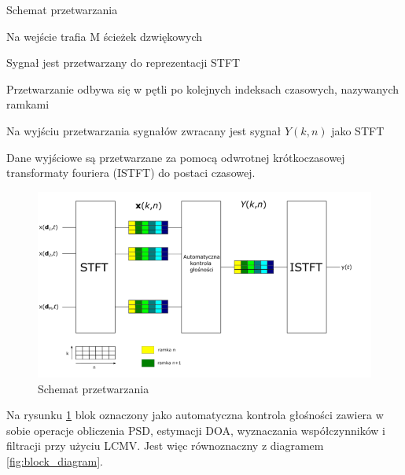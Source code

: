 \begin{algorithm}
  
  \caption{Schemat przetwarzania}
  \begin{algorithmic}[1]
    \State Na wejście trafia M ścieżek dzwiękowych
    
    \State Sygnał jest przetwarzany do reprezentacji STFT
    
    \State Przetwarzanie odbywa się w pętli po kolejnych indeksach czasowych, nazywanych ramkami
    
    \State Na wyjściu przetwarzania sygnałów zwracany jest sygnał $Y(k,n)$ jako STFT
    
    \State Dane wyjściowe są przetwarzane za pomocą odwrotnej krótkoczasowej transformaty fouriera (ISTFT) do postaci czasowej.
    
  \end{algorithmic}
\end{algorithm}

\begin{figure}[h!]
    \centering
    \includegraphics[width=\textwidth]{Images/processing.png}
    \caption{Schemat przetwarzania}
    \label{fig:processing}
\end{figure}

\noindent Na rysunku \ref{fig:processing} blok oznaczony jako automatyczna kontrola głośności zawiera w sobie operacje obliczenia PSD, estymacji DOA, wyznaczania współczynników i filtracji przy użyciu LCMV. Jest więc równoznaczny z diagramem \ref{fig:block_diagram}.

